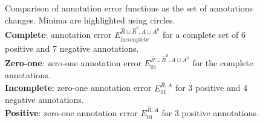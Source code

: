 \documentclass{article}
\begin{document}




\begin{figure}[H]
  
  \caption{Comparison of annotation error functions as the set of
    annotations changes. Minima are highlighted using circles.
    \protect\\
    \textbf{Complete}: annotation error
    $E_{\text{incomplete}}^{\hat R\cup \hat R^0,A\cup A^0}$ 
    for a complete set of 6
    positive and 7 negative annotations.
    \protect\\
    \textbf{Zero-one}: zero-one annotation error $E_{01}^{
      \hat R\cup \hat R^0,A\cup A^0}$
    for the complete annotations.
    \protect\\
    \textbf{Incomplete}: zero-one annotation error $E_{01}^{\hat R,A}$
    for 3 positive and 4 negative annotations.
    \protect\\
    \textbf{Positive}: zero-one annotation error $E_{01}^{\hat R,A}$
    for 3 positive annotations.}
  \label{fig:variable-density-sigerr}
\end{figure}
\end{document}
